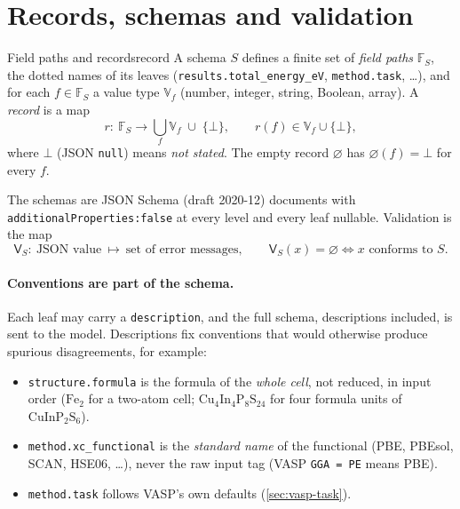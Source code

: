 \documentclass[11pt,a4paper]{article}
\newcommand{\Fset}{\mathbb{F}}
\newcommand{\Vset}{\mathbb{V}}
\newcommand{\nil}{\varnothing}
\newcommand{\valid}{\mathsf{V}}
\newcommand{\code}[1]{\texttt{#1}}
\begin{document}
\section{Records, schemas and validation}\label{sec:records}

\begin{defn}{Field paths and records}{record}
A schema \(S\) defines a finite set of \emph{field paths} \(\Fset_S\), the dotted names of its leaves
(\code{results.total\_energy\_eV}, \code{method.task}, \dots), and for each \(f\in\Fset_S\) a value type
\(\Vset_f\) (number, integer, string, Boolean, array). A \emph{record} is a map
\[
  r:\ \Fset_S \longrightarrow \bigcup_{f}\Vset_f \;\cup\; \{\bot\},\qquad r(f)\in \Vset_f\cup\{\bot\},
\]
where \(\bot\) (JSON \code{null}) means \emph{not stated}. The empty record \(\nil\) has \(\nil(f)=\bot\) for every \(f\).
\end{defn}

The schemas are JSON Schema (draft 2020-12) documents with \code{additionalProperties:false} at every level and
every leaf nullable. Validation is the map
\[
  \valid_S:\ \text{JSON value}\ \longmapsto\ \text{set of error messages},\qquad \valid_S(x)=\varnothing \iff x \text{ conforms to } S.
\]

\paragraph{Conventions are part of the schema.}
Each leaf may carry a \code{description}, and the full schema, descriptions included, is sent to the model.
Descriptions fix conventions that would otherwise produce spurious disagreements, for example:
\begin{itemize}
\item \code{structure.formula} is the formula of the \emph{whole cell}, not reduced, in input order
      (\(\mathrm{Fe_2}\) for a two-atom cell; \(\mathrm{Cu_4In_4P_8S_{24}}\) for four formula units of \(\mathrm{CuInP_2S_6}\)).
\item \code{method.xc\_functional} is the \emph{standard name} of the functional (PBE, PBEsol, SCAN, HSE06, \dots),
      never the raw input tag (VASP \code{GGA = PE} means PBE).
\item \code{method.task} follows VASP's own defaults (\cref{sec:vasp-task}).
\end{itemize}
\end{document}
